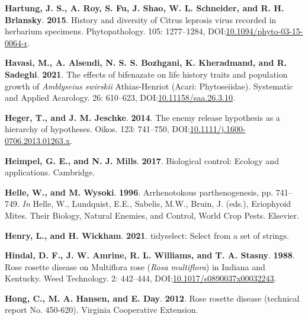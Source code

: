 \documentclass[12pt,final,CPage]{ufthesis}
\newlength{\cslhangindent}
\newenvironment{CSLReferences}[2] %
{%
	\setlength{\parindent}{0pt}
	\ifodd #1 \everypar{\setlength{\hangindent}{\cslhangindent}}\ignorespaces\fi
	\ifnum #2 > 0
	\setlength{\parskip}{#2\baselineskip}
	\fi
}%
{}
\begin{document}
{\begin{CSLReferences}{1}{0}
  \leavevmode{}%
  \textbf{Hartung, J. S., A. Roy, S. Fu, J. Shao, W. L. Schneider, and R. H. Brlansky}. \textbf{2015}. History and diversity of {Citrus leprosis virus} recorded in herbarium specimens. Phytopathology{\textregistered}. 105: 1277--1284, DOI:\href{https://doi.org/10.1094/phyto-03-15-0064-r}{10.1094/phyto-03-15-0064-r}.

  \leavevmode{}%
  \textbf{Havasi, M., A. Alsendi, N. S. S. Bozhgani, K. Kheradmand, and R. Sadeghi}. \textbf{2021}. The effects of bifenazate on life history traits and population growth of {\emph{Amblyseius swirskii}} {Athias-Henriot} ({Acari}: {Phytoseiidae}). Systematic and Applied Acarology. 26: 610--623, DOI:\href{https://doi.org/10.11158/saa.26.3.10}{10.11158/saa.26.3.10}.

  \leavevmode{}%
  \textbf{Heger, T., and J. M. Jeschke}. \textbf{2014}. The enemy release hypothesis as a hierarchy of hypotheses. Oikos. 123: 741--750, DOI:\href{https://doi.org/10.1111/j.1600-0706.2013.01263.x}{10.1111/j.1600-0706.2013.01263.x}.

  \leavevmode{}%
  \textbf{Heimpel, G. E., and N. J. Mills}. \textbf{2017}. Biological control: Ecology and applications. Cambridge.

  \leavevmode{}%
  \textbf{Helle, W., and M. Wysoki}. \textbf{1996}. Arrhenotokous parthenogenesis, pp. 741--749. \emph{In} Helle, W., Lundquist, E.E., Sabelis, M.W., Bruin, J. (eds.), Eriophyoid Mites. Their Biology, Natural Enemies, and Control, World Crop Pests. Elsevier.

  \leavevmode{}%
  \textbf{Henry, L., and H. Wickham}. \textbf{2021}. {tidyselect:} Select from a set of strings.

  \leavevmode{}%
  \textbf{Hindal, D. F., J. W. Amrine, R. L. Williams, and T. A. Stasny}. \textbf{1988}. {Rose rosette disease} on {Multiflora rose} ({\emph{Rosa multiflora}}) in {Indiana} and {Kentucky}. Weed Technology. 2: 442--444, DOI:\href{https://doi.org/10.1017/s0890037x00032243}{10.1017/s0890037x00032243}.

  \leavevmode{}%
  \textbf{Hong, C., M. A. Hansen, and E. Day}. \textbf{2012}. {Rose rosette disease} (technical report No. 450-620). Virginia Cooperative Extension.


\end{CSLReferences}}
\end{document}
